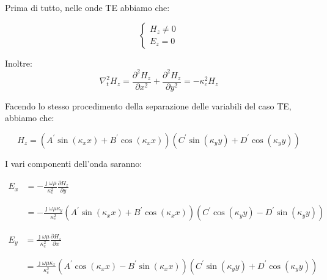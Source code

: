 Prima di tutto, nelle onde TE abbiamo che: 

{
    \Large 
    \begin{equation}
        \begin{cases}
            H_z \neq 0 \\ 
            E_z = 0
        \end{cases}
    \end{equation}
}

Inoltre: 
{
    \Large 
    \begin{equation}
        \nabla_t ^{2} H_z 
        = \frac{\partial ^{2} H_z}{\partial x^{2}} + \frac{\partial ^{2} H_z}{\partial y^{2}}
        = - \kappa_c ^{2} H_z
    \end{equation}
}

Facendo lo stesso procedimento della separazione delle variabili del caso TE, abbiamo che: 

{
    \Large 
    \begin{equation}
        H_z 
        = 
        (A^{'} \sin(\kappa_x x) + B^{'} \cos(\kappa_x x)) (C^{'} \sin(\kappa_y y) + D^{'} \cos(\kappa_y y))
    \end{equation}
}

I vari componenti dell'onda saranno: 

{
    \Large
    \begin{equation}
        \begin{split}
            E_x 
            &= 
            -\frac{\jmath \omega \mu}{\kappa_c ^{2}} \frac{\partial H_z}{\partial y}
            \\ \\ \\
            &= 
            - \frac{\jmath \omega \mu \kappa_y}{\kappa_c ^{2}} (A^{'} \sin(\kappa_x x) + B^{'} \cos(\kappa_x x)) (C^{'} \cos(\kappa_y y) - D^{'} \sin(\kappa_y y))
        \end{split}
    \end{equation}
}

{
    \Large
    \begin{equation}
        \begin{split}
            E_y 
            &= 
            \frac{\jmath \omega \mu}{\kappa_c ^{2}} \frac{\partial H_z}{\partial x}
            \\ \\ \\
            &= 
            \frac{\jmath \omega \mu \kappa_x}{\kappa_c ^{2}} (A^{'} \cos(\kappa_x x) - B^{'} \sin(\kappa_x x)) (C^{'} \sin(\kappa_y y) + D^{'} \cos(\kappa_y y))
        \end{split}
    \end{equation}
}

